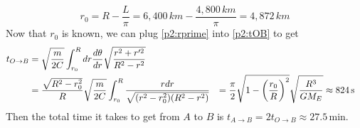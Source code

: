 \documentclass[12pt]{article}
\begin{document}
\begin{problem}{2}
\begin{solution}
\begin{equation}
        r_0=R-\frac{L}{\pi}
        =6,400\,\si{km}-\frac{4,800\,\si{km}}{\pi}=4,872\,\si{km}
    \end{equation}
    Now that $r_0$ is known, we can plug \eqref{p2:rprime} into \eqref{p2:tOB}
    to get
    \begin{align}
        t_{O\to B}
        &=\sqrt{\frac{m}{2C}}\int_{r_0}^Rdr\frac{d\theta}{dr}
            \sqrt{\frac{r^2+r'^2}{R^2-r^2}}\notag\\
        &=\frac{\sqrt{R^2-r_0^2}}{R}\sqrt{\frac{m}{2C}}
            \int_{r_0}^R\frac{rdr}{\sqrt{(r^2-r_0^2)(R^2-r^2)}}
        &=\frac{\pi}{2}\sqrt{1-\qty(\frac{r_0}{R})^2}\sqrt{\frac{R^3}{GM_E}}
        &\approx824\,\si{s}
    \end{align}
    Then the total time it takes to get from $A$ to $B$ is $t_{A\to B}=2t_{O\to
    B}\approx27.5$\,\si{min}.
\end{solution}

\end{problem}
\end{document}
